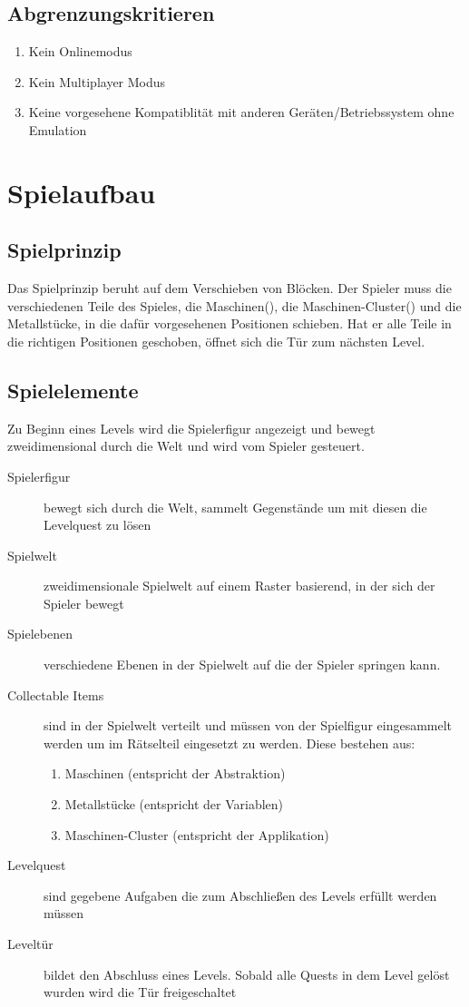 \documentclass{scrartcl}
\begin{document}
\subsection{Abgrenzungskritieren}

\begin{enumerate}
	\item Kein Onlinemodus
	\item Kein Multiplayer Modus
	\item Keine vorgesehene Kompatiblität mit anderen Geräten/Betriebssystem ohne Emulation
\end{enumerate}

\clearpage

\section{Spielaufbau}

\subsection{Spielprinzip}
Das Spielprinzip beruht auf dem Verschieben von Blöcken. Der Spieler muss die verschiedenen Teile des Spieles, die Maschinen(), die Maschinen-Cluster() und die Metallstücke, in die dafür vorgesehenen Positionen schieben. Hat er alle Teile in die richtigen Positionen geschoben, öffnet sich die Tür zum nächsten Level.


\subsection{Spielelemente}

Zu Beginn eines Levels wird die Spielerfigur angezeigt und bewegt zweidimensional durch die Welt und wird vom Spieler gesteuert.

\begin{description}
	\item[Spielerfigur] bewegt sich durch die Welt, sammelt Gegenstände um mit diesen die Levelquest zu lösen
	\item[Spielwelt] zweidimensionale Spielwelt auf einem Raster basierend, in der sich der Spieler bewegt
	\item[Spielebenen] verschiedene Ebenen in der Spielwelt auf die der Spieler springen kann.
	\item[Collectable Items] \label{elemente:collectable}sind in der Spielwelt verteilt und müssen von der Spielfigur eingesammelt werden um im Rätselteil eingesetzt zu werden. Diese bestehen aus:
	\begin{enumerate}[label=\arabic*]
		\item Maschinen (entspricht der Abstraktion)
		\item Metallstücke (entspricht der Variablen)
		\item Maschinen-Cluster (entspricht der Applikation)
	\end{enumerate}
	\item[Levelquest] sind gegebene Aufgaben die zum Abschließen des Levels erfüllt werden müssen
	\item[Leveltür] bildet den Abschluss eines Levels. Sobald alle Quests in dem Level gelöst wurden wird die Tür freigeschaltet
\end{description}
\end{document}
